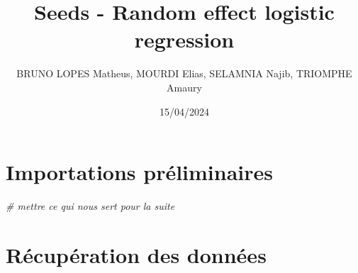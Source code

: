 \documentclass[
]{article}
\title{Seeds - Random effect logistic regression}
\author{BRUNO LOPES Matheus, MOURDI Elias, SELAMNIA Najib, TRIOMPHE
Amaury}
\date{15/04/2024}
\newenvironment{Shaded}{\begin{snugshade}}{\end{snugshade}}
\newcommand{\CommentTok}[1]{\textcolor[rgb]{0.56,0.35,0.01}{\textit{#1}}}
\begin{document}
\maketitle

\hypertarget{importations-pruxe9liminaires}{%
\section{Importations
préliminaires}\label{importations-pruxe9liminaires}}

\begin{Shaded}
\begin{Highlighting}[]
\CommentTok{\# mettre ce qui nous sert pour la suite}
\end{Highlighting}
\end{Shaded}

\hypertarget{ruxe9cupuxe9ration-des-donnuxe9es}{%
\section{Récupération des
données}\label{ruxe9cupuxe9ration-des-donnuxe9es}}
\end{document}

